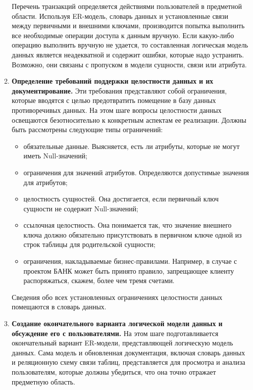 \begin{enumerate}
        Перечень транзакций определяется действиями пользователей в предметной области. Используя ER-модель,
        словарь данных и установленные связи между первичными и внешними ключами, производится попытка выполнить
        все необходимые операции доступа к данным вручную. Если какую-либо операцию выполнить вручную не удается,
        то составленная логическая модель данных является неадекватной и содержит ошибки, которые надо устранить.
        Возможно, они связаны с пропуском в модели сущности, связи или атрибута.

    \item \textbf{Определение требований поддержки целостности данных и их документирование.}
        Эти требования представляют собой ограничения, которые вводятся с целью предотвратить помещение в базу
        данных противоречивых данных. На этом шаге вопросы целостности данных освещаются безотносительно к
        конкретным аспектам ее реализации. Должны быть рассмотрены следующие типы ограничений:
        \begin{itemize}
            \item обязательные данные. Выясняется, есть ли атрибуты, которые не могут иметь Null-значений;

            \item ограничения для значений атрибутов. Определяются допустимые значения для атрибутов;

            \item целостность сущностей. Она достигается, если первичный ключ сущности не содержит Null-значений;

            \item ссылочная целостность. Она понимается так, что значение внешнего ключа должно обязательно
            присутствовать в первичном ключе одной из строк таблицы для родительской сущности;

            \item ограничения, накладываемые бизнес-правилами. Например, в случае с проектом БАНК может быть
            принято правило, запрещающее клиенту распоряжаться, скажем, более чем тремя счетами.
        \end{itemize}

    Сведения обо всех установленных ограничениях целостности данных помещаются в словарь данных.

    \item \textbf{Создание окончательного варианта логической модели данных и обсуждение его с пользователями.}
        На этом шаге подготавливается окончательный вариант ER-модели, представляющей логическую модель данных.
        Сама модель и обновленная документация, включая словарь данных и реляционную схему связи таблиц,
        представляется для просмотра и анализа пользователям, которые должны убедиться, что она точно
        отражает предметную область.
\end{enumerate}

